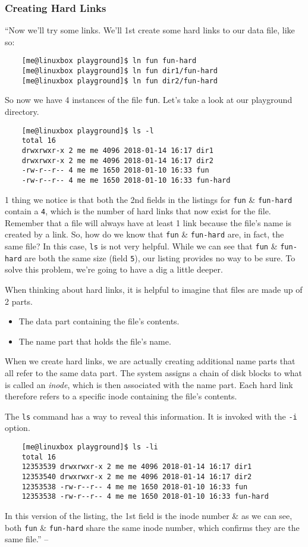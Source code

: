 \documentclass[oneside]{book}
\numberwithin{equation}{section}
\begin{document}
\subsubsection{Creating Hard Links}
``Now we'll try some links. We'll 1st create some hard links to our data file, like so:
\begin{verbatim}
	[me@linuxbox playground]$ ln fun fun-hard
	[me@linuxbox playground]$ ln fun dir1/fun-hard
	[me@linuxbox playground]$ ln fun dir2/fun-hard
\end{verbatim}
So now we have 4 instances of the file \texttt{fun}. Let's take a look at our playground directory.
\begin{verbatim}
	[me@linuxbox playground]$ ls -l
	total 16
	drwxrwxr-x 2 me me 4096 2018-01-14 16:17 dir1
	drwxrwxr-x 2 me me 4096 2018-01-14 16:17 dir2
	-rw-r--r-- 4 me me 1650 2018-01-10 16:33 fun
	-rw-r--r-- 4 me me 1650 2018-01-10 16:33 fun-hard
\end{verbatim}
1 thing we notice is that both the 2nd fields in the listings for \texttt{fun} \& \texttt{fun-hard} contain a \texttt{4}, which is the number of hard links that now exist for the file. Remember that a file will always have at least 1 link because the file's name is created by a link. So, how do we know that \texttt{fun} \& \texttt{fun-hard} are, in fact, the same file? In this case, \texttt{ls} is not very helpful. While we can see that \texttt{fun} \& \texttt{fun-hard} are both the same size (field \texttt{5}), our listing provides no way to be sure. To solve this problem, we're going to have a dig a little deeper.

When thinking about hard links, it is helpful to imagine that files are made up of 2 parts.
\begin{itemize}
	\item The data part containing the file's contents.
	\item The name part that holds the file's name.
\end{itemize}
When we create hard links, we are actually creating additional name parts that all refer to the same data part. The system assigns a chain of disk blocks to what is called an \textit{inode}, which is then associated with the name part. Each hard link therefore refers to a specific inode containing the file's contents.

The \texttt{ls} command has a way to reveal this information. It is invoked with the \texttt{-i} option.
\begin{verbatim}
	[me@linuxbox playground]$ ls -li
	total 16
	12353539 drwxrwxr-x 2 me me 4096 2018-01-14 16:17 dir1
	12353540 drwxrwxr-x 2 me me 4096 2018-01-14 16:17 dir2
	12353538 -rw-r--r-- 4 me me 1650 2018-01-10 16:33 fun
	12353538 -rw-r--r-- 4 me me 1650 2018-01-10 16:33 fun-hard
\end{verbatim}
In this version of the listing, the 1st field is the inode number \& as we can see, both \texttt{fun} \& \texttt{fun-hard} share the same inode number, which confirms they are the same file.'' -- \cite[pp. 77--78]{Shotts2019}
\end{document}
